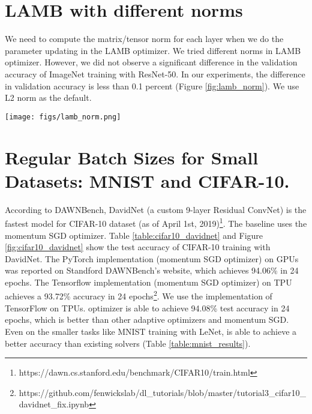 \documentclass{article} \usepackage{iclr2020_conference,times}
\begin{document}
\section{LAMB with different norms}
We need to compute the matrix/tensor norm for each layer when we do the parameter updating in the LAMB optimizer.
We tried different norms in LAMB optimizer. However, we did not observe a significant difference in the validation accuracy of ImageNet training with ResNet-50. In our experiments, the difference in validation accuracy is less than 0.1 percent (Figure \ref{fig:lamb_norm}). We use L2 norm as the default.

\begin{figure*}[tb]
\vspace{5pt}
\centering
\texttt{[image: figs/lamb\_norm.png]}
\caption{We tried different norms in LAMB optimizer. However, we did not observe a significant difference in the validation accuracy of ImageNet training with ResNet-50. We use L2 norm as the default.}
\label{fig:lamb_norm}
\vspace{-10pt}
\end{figure*}

\section{Regular Batch Sizes for Small Datasets: MNIST and CIFAR-10.}
According to DAWNBench, DavidNet (a custom 9-layer Residual ConvNet) is the fastest model for CIFAR-10 dataset (as of April 1st, 2019)\footnote{https://dawn.cs.stanford.edu/benchmark/CIFAR10/train.html}.
The baseline uses the momentum SGD optimizer.
Table \ref{table:cifar10_davidnet} and Figure \ref{fig:cifar10_davidnet} show the test accuracy of CIFAR-10 training with DavidNet. The PyTorch implementation (momentum SGD optimizer) on GPUs was reported on Standford DAWNBench's website, which achieves 94.06\% in 24 epochs. The Tensorflow implementation (momentum SGD optimizer) on TPU achieves a 93.72\% accuracy in 24 epochs\footnote{https://github.com/fenwickslab/dl\_tutorials/blob/master/tutorial3\_cifar10\_davidnet\_fix.ipynb}. We use the implementation of TensorFlow on TPUs.  optimizer is able to achieve 94.08\% test accuracy in 24 epochs, which is better than other adaptive optimizers and momentum SGD.
Even on the smaller tasks like MNIST training with LeNet,  is able to achieve a better accuracy than existing solvers (Table \ref{table:mnist_results}).
\end{document}
